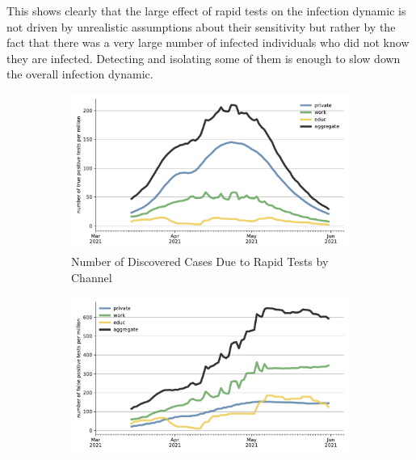 This shows clearly that the large effect of rapid tests on the infection dynamic
is not driven by unrealistic assumptions about their sensitivity but rather by the
fact that there was a very large number of infected individuals who did not know they
are infected. Detecting and isolating some of them is enough to slow down the
overall infection dynamic.

\begin{figure}   %
    \centering
    \begin{subfigure}[b]{0.425\textwidth}
        \centering
        \includegraphics[width=\textwidth]{figures/results/figures/rapid_test_statistics/number_true_positive}
        \caption{Number of Discovered Cases Due to Rapid Tests by Channel}
        \label{fig:rapid_tests_number_true_positive}
    \end{subfigure}
    \hfill
    \begin{subfigure}[b]{0.425\textwidth}
        \centering
        \includegraphics[width=\textwidth]{figures/results/figures/rapid_test_statistics/number_false_positive}

\end{subfigure}
\end{figure}
